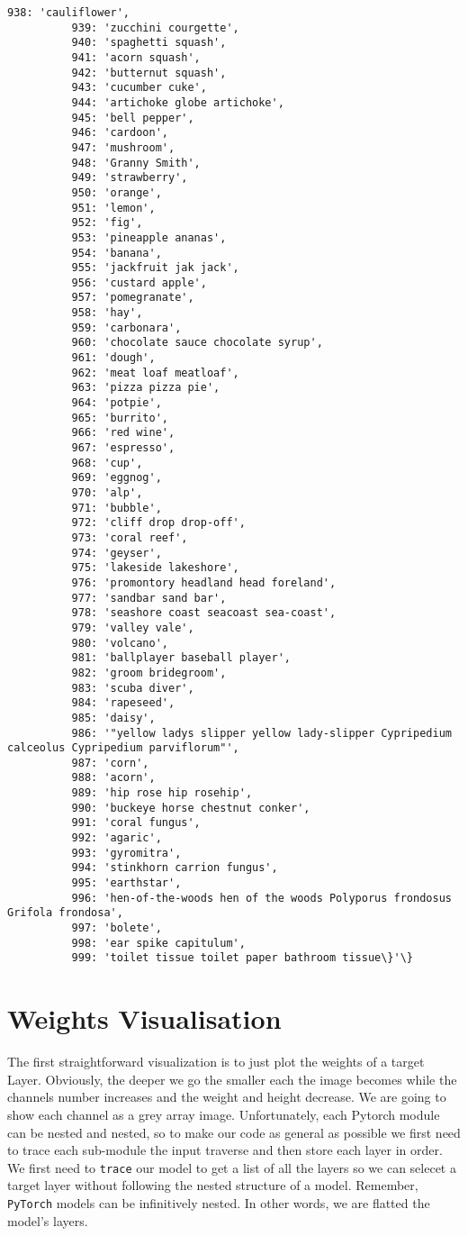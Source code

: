\documentclass[11pt]{article}
\begin{document}
\begin{Verbatim}[commandchars=\\\{\}]
          938: 'cauliflower',
          939: 'zucchini courgette',
          940: 'spaghetti squash',
          941: 'acorn squash',
          942: 'butternut squash',
          943: 'cucumber cuke',
          944: 'artichoke globe artichoke',
          945: 'bell pepper',
          946: 'cardoon',
          947: 'mushroom',
          948: 'Granny Smith',
          949: 'strawberry',
          950: 'orange',
          951: 'lemon',
          952: 'fig',
          953: 'pineapple ananas',
          954: 'banana',
          955: 'jackfruit jak jack',
          956: 'custard apple',
          957: 'pomegranate',
          958: 'hay',
          959: 'carbonara',
          960: 'chocolate sauce chocolate syrup',
          961: 'dough',
          962: 'meat loaf meatloaf',
          963: 'pizza pizza pie',
          964: 'potpie',
          965: 'burrito',
          966: 'red wine',
          967: 'espresso',
          968: 'cup',
          969: 'eggnog',
          970: 'alp',
          971: 'bubble',
          972: 'cliff drop drop-off',
          973: 'coral reef',
          974: 'geyser',
          975: 'lakeside lakeshore',
          976: 'promontory headland head foreland',
          977: 'sandbar sand bar',
          978: 'seashore coast seacoast sea-coast',
          979: 'valley vale',
          980: 'volcano',
          981: 'ballplayer baseball player',
          982: 'groom bridegroom',
          983: 'scuba diver',
          984: 'rapeseed',
          985: 'daisy',
          986: '"yellow ladys slipper yellow lady-slipper Cypripedium calceolus Cypripedium parviflorum"',
          987: 'corn',
          988: 'acorn',
          989: 'hip rose hip rosehip',
          990: 'buckeye horse chestnut conker',
          991: 'coral fungus',
          992: 'agaric',
          993: 'gyromitra',
          994: 'stinkhorn carrion fungus',
          995: 'earthstar',
          996: 'hen-of-the-woods hen of the woods Polyporus frondosus Grifola frondosa',
          997: 'bolete',
          998: 'ear spike capitulum',
          999: 'toilet tissue toilet paper bathroom tissue\}'\}
\end{Verbatim}
            
    \section{Weights Visualisation}\label{weights-visualisation}

The first straightforward visualization is to just plot the weights of a
target Layer. Obviously, the deeper we go the smaller each the image
becomes while the channels number increases and the weight and height
decrease. We are going to show each channel as a grey array image.
Unfortunately, each Pytorch module can be nested and nested, so to make
our code as general as possible we first need to trace each sub-module
the input traverse and then store each layer in order. We first need to
\texttt{trace} our model to get a list of all the layers so we can
selecet a target layer without following the nested structure of a
model. Remember, \texttt{PyTorch} models can be infinitively nested. In
other words, we are flatted the model's layers.
\end{document}
